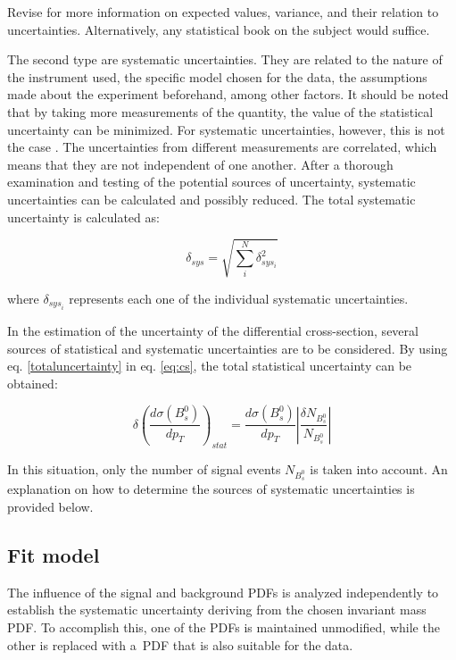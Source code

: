 Revise \cite{vsirca2016probability} for more information on expected values, variance, and their relation to uncertainties. Alternatively, any statistical book on the subject would suffice.

The second type are systematic uncertainties. They are related to the nature of the instrument used, the specific model chosen for the data, the assumptions made about the experiment beforehand, among other factors. It should be noted that by taking more measurements of the quantity, the value of the statistical uncertainty can be minimized. For systematic uncertainties, however, this is not the case \cite{sinervo2003definition}. The uncertainties from different measurements are correlated, which means that they are not independent of one another. After a thorough examination and testing of the potential sources of uncertainty, systematic uncertainties can be calculated and possibly reduced. The total systematic uncertainty is calculated as:

\begin{equation}
	\delta_{sys} = \sqrt{\sum_{i}^{N} \delta_{{sys}_{i}}^2}
\end{equation}

where $\delta_{{sys}_i}$ represents each one of the individual systematic uncertainties.

In the estimation of the uncertainty of the differential cross-section, several sources of statistical and systematic uncertainties are to be considered. By using eq. \ref{totaluncertainty} in eq. \ref{eq:cs}, the total statistical uncertainty can be obtained:

\begin{equation}
	\delta \left(\frac{d\sigma(B_s^0)}{dp_T} \right)_{stat} 
 =\frac{d \sigma(B_s^0)}{dp_T}\left| \frac{\delta N_{B_s^{0}}}{N_{B_s^{0}}}\right|
 \end{equation}

In this situation, only the number of signal events $N_{B_s^{0}}$ is taken into account. An explanation on how to determine the sources of systematic uncertainties is provided below. 

\subsection{Fit model}

The influence of the signal and background PDFs is analyzed independently to establish the systematic uncertainty deriving from the chosen invariant mass PDF. To accomplish this, one of the PDFs is maintained unmodified, while the other is replaced with a PDF that is also suitable for the data.

